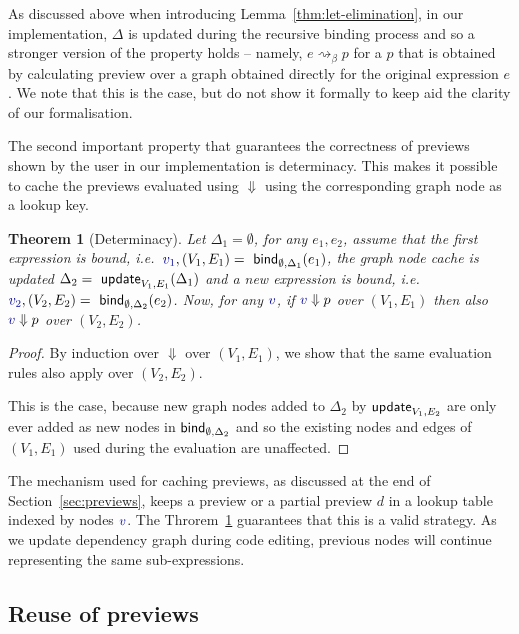 \documentclass[sigplan,10pt,review,anonymous]{acmart}\settopmatter{printfolios=true,printccs=false,printacmref=false}
\newcounter{thc}
\theoremstyle{plain}
\newtheorem{theorem}[thc]{Theorem}
\theoremstyle{definition}
\newcommand{\ident}[1]{\textnormal{\sffamily #1}}
\newcommand{\bndclr}[1]{\textcolor{kvdclr}{#1}}
\begin{document}
As discussed above when introducing Lemma~\ref{thm:let-elimination}, in our implementation,
$\Delta$ is updated during the recursive binding process and so a stronger version of the property
holds -- namely, $e \rightsquigarrow_\beta p$ for a $p$ that is obtained by calculating preview 
over a graph obtained directly for the original expression $e$. We note that this is the case, but
do not show it formally to keep aid the clarity of our formalisation.

The second important property that guarantees the correctness of previews shown by the user in 
our implementation is determinacy. This makes it possible to cache the previews evaluated using
$\Downarrow$ using the corresponding graph node as a lookup key.

\begin{theorem}[Determinacy]
\label{thm:determinacy}
Let $\Delta_1 = \emptyset$, for any $e_1, e_2$, assume that the first expression is bound,
i.e.~$\bndclr{v_1}, (V_1, E_1) = \ident{bind}_{\emptyset, \Delta_1}(e_1)$, the graph node cache
is updated $\Delta_2 = \ident{update}_{V_1, E_1}(\Delta_1)$ and a new expression is bound, i.e.~
$\bndclr{v_2}, (V_2, E_2) = \ident{bind}_{\emptyset, \Delta_2}(e_2)$. Now, for any $\bndclr{v}$, 
if $\bndclr{v} \Downarrow p$ over $(V_1, E_1)$ then also
 $\bndclr{v} \Downarrow p$ over $(V_2, E_2)$.
\end{theorem}
\begin{proof}
By induction over $\Downarrow$ over $(V_1, E_1)$, we show that the same evaluation rules also
apply over $(V_2, E_2)$. 

This is the case, because new graph nodes added to $\Delta_2$ by $\ident{update}_{V_1, E_2}$
are only ever added as new nodes in $\ident{bind}_{\emptyset, \Delta_2}$ and so the existing 
nodes and edges of $(V_1, E_1)$ used during the evaluation are unaffected.
\end{proof}

The mechanism used for caching previews, as discussed at the end of Section~\ref{sec:previews},
keeps a preview or a partial preview $d$ in a lookup table indexed by nodes $\bndclr{v}$. The
Throrem~\ref{thm:determinacy} guarantees that this is a valid strategy. As we update dependency
graph during code editing, previous nodes will continue representing the same sub-expressions.


\subsection{Reuse of previews}
\label{sec:properties-reuse}
\end{document}

